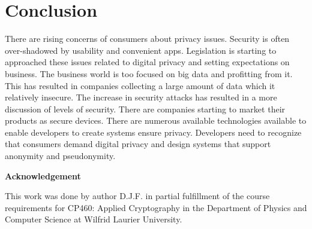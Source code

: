 \documentclass[12pt]{article}
\begin{document}
\section{Conclusion}\label{sec:conclusion}
There are rising concerns of consumers about privacy issues. Security is often over-shadowed by usability and convenient apps. Legislation is starting to approached these issues related to digital privacy and setting expectations on business. The business world is too focused on big data and profitting from it. This has resulted in companies collecting a large amount of data which it relatively insecure. The increase in security attacks has resulted in a more discussion of levels of security. There are companies starting to market their products as secure devices. There are numerous available technologies available to enable developers to create systems ensure privacy. Developers need to recognize that consumers demand digital privacy and design systems that support anonymity and pseudonymity.

\begin{center}
{\bf Acknowledgement}
\end{center}
This work was done by author D.J.F. in partial fulfillment of the course requirements for CP460: Applied Cryptography in the Department of Physics and Computer Science at Wilfrid Laurier University.
\end{document}

